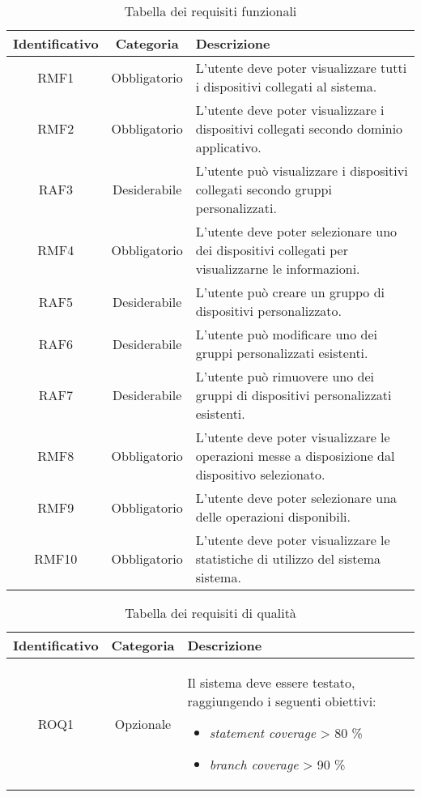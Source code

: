\begin{table}[H]
\caption{Tabella dei requisiti funzionali}
\label{tab:requisiti-funzionali}
\begin{tabularx}{\linewidth}{|c|c|X|}
\hline
\textbf{Identificativo} & \textbf{Categoria} & \textbf{Descrizione} \\
\hline
RMF1 & Obbligatorio & L'utente deve poter visualizzare tutti i dispositivi collegati al sistema. \\
\hline
RMF2 & Obbligatorio & L'utente deve poter visualizzare i dispositivi collegati secondo dominio applicativo. \\
\hline
RAF3 & Desiderabile & L'utente può visualizzare i dispositivi collegati secondo gruppi personalizzati. \\
\hline
RMF4 & Obbligatorio & L'utente deve poter selezionare uno dei dispositivi collegati per visualizzarne le informazioni. \\
\hline
RAF5 & Desiderabile & L'utente può creare un gruppo di dispositivi personalizzato. \\
\hline
RAF6 & Desiderabile & L'utente può modificare uno dei gruppi personalizzati esistenti. \\
\hline
RAF7 & Desiderabile & L'utente può rimuovere uno dei gruppi di dispositivi personalizzati esistenti. \\
\hline
RMF8 & Obbligatorio & L'utente deve poter visualizzare le operazioni messe a disposizione dal dispositivo selezionato. \\
\hline
RMF9 & Obbligatorio & L'utente deve poter selezionare una delle operazioni disponibili. \\
\hline
RMF10 & Obbligatorio & L'utente deve poter visualizzare le statistiche di utilizzo del sistema sistema. \\
\hline
\end{tabularx}
\end{table}


\begin{table}[H]
\caption{Tabella dei requisiti di qualità}
\label{tab:requisiti-qualita}
\begin{tabularx}{\linewidth}{|c|c|>{\setlength\hsize{\hsize}}X|}
\hline
\textbf{Identificativo} & \textbf{Categoria} & \textbf{Descrizione} \\
\hline
ROQ1 & Opzionale & Il sistema deve essere testato, raggiungendo i seguenti obiettivi:
\begin{itemize}
	\item \emph{statement coverage} > 80 \%
	\item \emph{branch coverage} > 90 \%
\end{itemize}\\
\hline
\end{tabularx}
\end{table}


